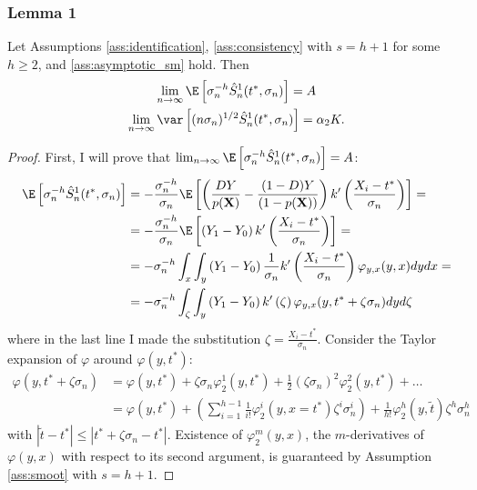 {\subsubsection*{Lemma 1}
    \begin{lem}\label{lemma1}
        Let Assumptions \ref{ass:identification}, \ref{ass:consistency} with $s=h + 1$ for some $h\geq 2$, and \ref{ass:asymptotic_sm} hold. Then
        \begin{gather}
            \lim_{n\rightarrow \infty} \E \left[ \sigma_n^{-h} \hat{S}_n^1(t^*,\sigma_n) \right] = A  \\
            \lim_{n\rightarrow \infty} \var \left[ (n\sigma_n)^{1/2} \hat{S}_n^1(t^*,\sigma_n) \right] = \alpha_2 K.
        \end{gather}
    \end{lem}
    \begin{proof}
        First, I will prove that $\lim_{n\rightarrow \infty} \E \left[ \sigma_n^{-h} \hat{S}_n^1(t^*,\sigma_n) \right] = A$:
        \begin{align}
            \E \left[ \sigma_n^{-h} \hat{S}_n^1(t^*,\sigma_n) \right] &= - \frac{\sigma_n^{-h}}{\sigma_n} \E\left[\left(\frac{D Y}{p(\textbf{X})} - \frac{(1-D) Y}{(1-p(\textbf{X}))} \right) k'\left(\frac{X_i - t^*}{\sigma_n} \right) \right] = \\
            &= - \frac{\sigma_n^{-h}}{\sigma_n} \E\left[\left(Y_1 - Y_0 \right) k'\left(\frac{X_i - t^*}{\sigma_n} \right) \right] = \\
            &= - \sigma_n^{-h} \int_x \int_y \left(Y_1 - Y_0 \right) \frac{1}{\sigma_n} k'\left(\frac{X_i - t^*}{\sigma_n} \right) \varphi_{y,x}(y,x) d y d x = \\
            &= - \sigma_n^{-h} \int_\zeta \int_y \left(Y_1 - Y_0 \right) k'\left(\zeta \right) \varphi_{y,x}(y,t^* + \zeta \sigma_n) d y d \zeta
        \end{align}
        where in the last line I made the substitution $\zeta = \frac{X_i - t^*}{\sigma_n}$. Consider the Taylor expansion of $\varphi$ around $\varphi(y,t^*)$:
        \begin{align}
            \varphi(y,t^* + \zeta \sigma_n) &= \varphi(y,t^*) + \zeta \sigma_n \varphi^{1}_2(y,t^*) + \frac{1}{2} (\zeta \sigma_n)^2 \varphi^{2}_2(y,t^*) + \dots \\
            &= \varphi(y,t^*) + \left( \sum_{i=1}^{h-1} \frac{1}{i!} \varphi^{i}_2(y,x=t^*) \zeta^i \sigma_n^i \right) + \frac{1}{h!} \varphi^{h}_2(y,\tilde{t}) \zeta^h \sigma_n^h
        \end{align}
        with $|\tilde{t}-t^*| \leq |t^* + \zeta \sigma_n - t^*|$. Existence of $\varphi^{m}_2(y,x)$, the $m$-derivatives of $\varphi(y,x)$ with respect to its second argument, is guaranteed by Assumption \ref{ass:smoot} with $s=h+1$.


\end{proof}}
